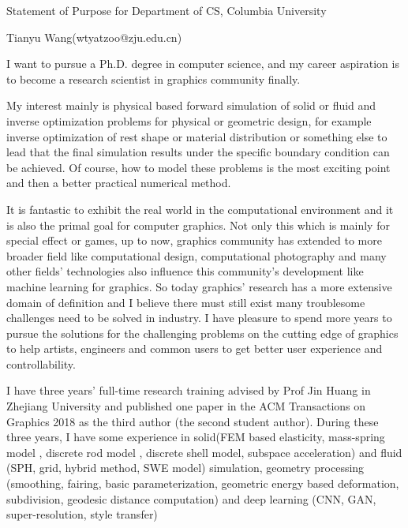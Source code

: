 \documentclass[a4paper,12pt]{article}
\begin{document}
\centerline{\large{Statement of Purpose for Department of CS, Columbia University}}
\vspace{2ex}
\centerline{\large{Tianyu Wang(wtyatzoo@zju.edu.cn)}}
\vspace{2ex}

I want to pursue a Ph.D. degree in computer science, and my career aspiration is to become a research scientist in graphics community finally.\vspace{1.2ex}

My interest mainly is physical based forward simulation of solid or fluid and inverse optimization problems for physical or geometric design, for example inverse optimization of rest shape or material distribution or something else to lead that the final simulation results under the specific boundary condition can be achieved. Of course, how to model these problems is the most exciting point and then a better practical numerical method.\vspace{1.2ex}

It is fantastic to exhibit the real world in the computational environment and it is also the primal goal for computer graphics. Not only this which is mainly for special effect or games, up to now, graphics community has extended to more broader field like computational design, computational photography and many other fields' technologies also influence this community's development like machine learning for graphics. So today graphics' research has a more extensive domain of definition and I believe there must still exist many troublesome challenges need to be solved in industry. I have pleasure to spend more years to pursue the solutions for the challenging problems on the cutting edge of graphics to help artists, engineers and common users to get better user experience and controllability. \vspace{1.2ex} 

I have three years' full-time research training advised by Prof Jin Huang in Zhejiang University and published one paper in the ACM Transactions on Graphics 2018 as the third author (the second student author). During these three years, I have some experience in solid(FEM based elasticity, mass-spring model , discrete rod model , discrete shell model, subspace acceleration) and fluid (SPH, grid, hybrid method, SWE model) simulation, geometry processing (smoothing, fairing, basic parameterization, geometric energy based deformation, subdivision, geodesic distance computation) and deep learning (CNN, GAN, super-resolution, style transfer)\vspace{1.2ex} 
\end{document}
